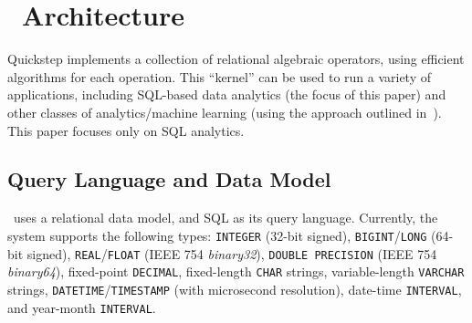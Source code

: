 
\section{\QUICKSTEP\ Architecture} 

\label{architecture}
Quickstep
implements a collection of relational algebraic operators, using efficient algorithms for each operation. %
This ``kernel'' can be used to run a variety of applications, including SQL-based data analytics (the focus of this paper) and other classes of analytics/machine learning (using the approach outlined in~\cite{FanRP15, QuickFOIL}). This paper focuses only on SQL analytics.

\subsection{Query Language and Data Model} \label{model-n-query-language}

\Quickstep\ uses a relational data model, and SQL as its query language. 
Currently, the system supports the following types: \texttt{INTEGER} (32-bit signed), \texttt{BIGINT}/\texttt{LONG} (64-bit signed), \texttt{REAL}/\texttt{FLOAT} (IEEE 754 \textit{binary32}), \texttt{DOUBLE PRECISION} (IEEE 754 \textit{binary64}), fixed-point \texttt{DECIMAL}, fixed-length \texttt{CHAR} strings, variable-length \texttt{VARCHAR} strings,  \texttt{DATETIME}/\texttt{TIMESTAMP} (with microsecond resolution), date-time \texttt{INTERVAL}, and year-month \texttt{INTERVAL}. 

